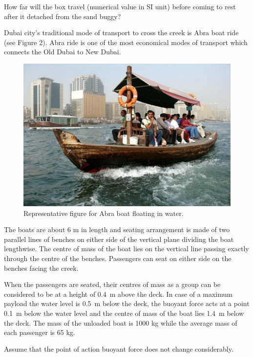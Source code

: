 {\prob
How far will the box travel (numerical value in SI unit) before coming to rest after it detached from the sand buggy?


Dubai city’s traditional mode of transport to cross the creek is Abra boat ride (see Figure 2). Abra ride is one of the most economical modes of transport which connects the Old Dubai to New Dubai.
\begin{figure}[!htbp]
  \centering
  \includegraphics[width=0.7\linewidth]{2021-t-02-p3}
  \caption{Representative figure for Abra boat floating in water. }
\end{figure}

The boats are about 6 m in length and seating arrangement is made of two parallel lines of benches on either side of the vertical plane dividing the boat lengthwise. The centre of mass of the boat lies on the vertical line passing exactly through the centre of the benches. Passengers can seat on either side on the benches facing the creek.

When the passengers are seated, their centres of mass as a group can be considered to be at a height of \SI{0.4}{\m} above the deck. In case of a maximum payload the water level is \SI{0.5}{\m} below the deck, the buoyant force acts at a point \SI{0.1}{\m} below the water level and the centre of mass of the boat lies \SI{1.4}{\m} below the deck. The mass of the unloaded boat is 1000 kg while the average mass of each passenger is 65 kg.

Assume that the point of action buoyant force does not change considerably.

}

